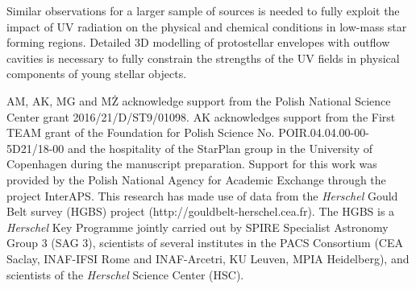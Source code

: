 \documentclass{aa}
\begin{document}
Similar observations for a larger sample of sources is needed to fully exploit 
the impact of UV radiation on the physical and chemical conditions in low-mass star 
forming regions. Detailed 3D modelling of protostellar envelopes with outflow cavities 
is necessary to fully constrain the strengths of the UV fields in physical components 
of young stellar objects.

\begin{acknowledgements} AM, AK, MG and MŻ acknowledge support from the Polish National Science
Center grant 2016/21/D/ST9/01098. AK acknowledges support from the First TEAM grant of 
the Foundation for Polish Science No. POIR.04.04.00-00-5D21/18-00 and the hospitality 
of the StarPlan group in the University of Copenhagen during the manuscript preparation.
Support for this work was provided by the Polish National Agency for Academic Exchange through the project InterAPS.
This research has made use of data from the \textit{Herschel} Gould Belt survey (HGBS) project
(http://gouldbelt-herschel.cea.fr). The HGBS is a \textit{Herschel} Key Programme jointly carried out by
SPIRE Specialist Astronomy Group 3 (SAG 3), scientists of several institutes in the PACS Consortium
(CEA Saclay, INAF-IFSI Rome and INAF-Arcetri, KU Leuven, MPIA Heidelberg), and scientists of the
\textit{Herschel} Science Center (HSC). 
\end{acknowledgements}


\end{document}
